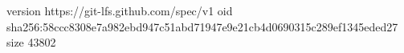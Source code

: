version https://git-lfs.github.com/spec/v1
oid sha256:58ccc8308e7a982ebd947c51abd71947e9e21cb4d0690315c289ef1345eded27
size 43802
